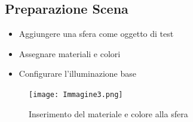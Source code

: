 \documentclass[11pt]{report}
\begin{document}
\subsection{Preparazione Scena}
\begin{itemize}
\item Aggiungere una sfera come oggetto di test
\item Assegnare materiali e colori
\item Configurare l'illuminazione base
\end{itemize}

\begin{figure}[H]
    \centering
    \texttt{[image: Immagine3.png]}
    \caption{Inserimento del materiale e colore alla sfera}
    \label{fig:sphere_material}
\end{figure}
\end{document}

